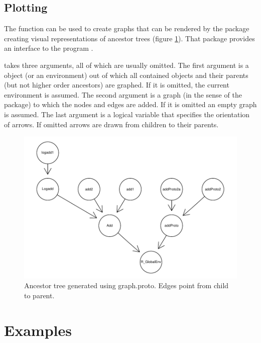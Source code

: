 \documentclass{Z}
\begin{document}
\subsection{Plotting}
\label{sec:plot}

The  function can be used to create 
graphs that can be rendered by the  package
creating visual representations of ancestor trees (figure
\ref{fig:proto-dot}).  
That package provides an interface to the 
  program \citep{Ganser+North:1999}.

 takes three arguments, all of which are
usually omitted.  The first argument is a  object
(or an environment) out of which all contained  objects
and their parents (but not higher order ancestors) are graphed.  
If it is omitted, the current environment is assumed.
The second argument is a graph (in the sense of the 
package) to which the nodes and edges are added.  If it is omitted
an empty graph is assumed.  The last argument is a logical variable
that specifies the orientation of arrows.  If omitted arrows are
drawn from children to their parents.




\begin{figure}[htbp]
\begin{center}
\includegraphics{proto-dot}
\caption{\label{fig:proto-dot} Ancestor tree generated using graph.proto. Edges
point from child to parent.}
\end{center}
\end{figure}

\pagebreak[4]

\section{Examples} 
\label{sec:examples}
\end{document}
